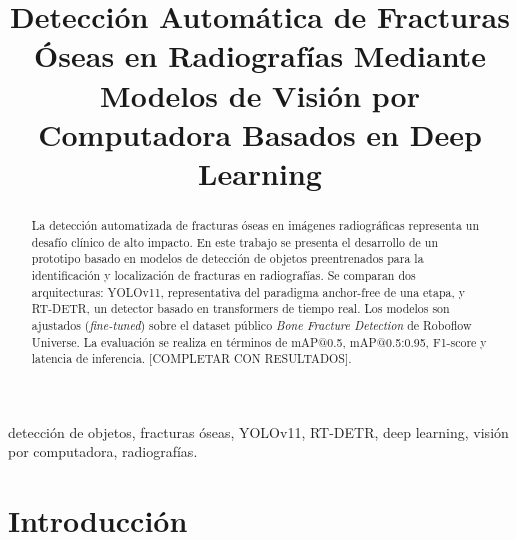 \documentclass[conference]{IEEEtran}
\begin{document}
\title{Detección Automática de Fracturas Óseas en Radiografías Mediante Modelos de Visión por Computadora Basados en Deep Learning}

\author{
\and
{}
\and
{}
}

\maketitle

\begin{abstract}
La detección automatizada de fracturas óseas en imágenes radiográficas representa
un desafío clínico de alto impacto. En este trabajo se presenta el desarrollo de un
prototipo basado en modelos de detección de objetos preentrenados para la
identificación y localización de fracturas en radiografías.
Se comparan dos arquitecturas: YOLOv11, representativa del paradigma
anchor-free de una etapa, y RT-DETR, un detector basado en transformers de
tiempo real. Los modelos son ajustados (\textit{fine-tuned}) sobre el dataset
público \textit{Bone Fracture Detection} de Roboflow Universe.
La evaluación se realiza en términos de mAP@0.5, mAP@0.5:0.95, F1-score y
latencia de inferencia. [COMPLETAR CON RESULTADOS].
\end{abstract}

\begin{IEEEkeywords}
detección de objetos, fracturas óseas, YOLOv11, RT-DETR, deep learning,
visión por computadora, radiografías.
\end{IEEEkeywords}

\section{Introducción}
\end{document}
